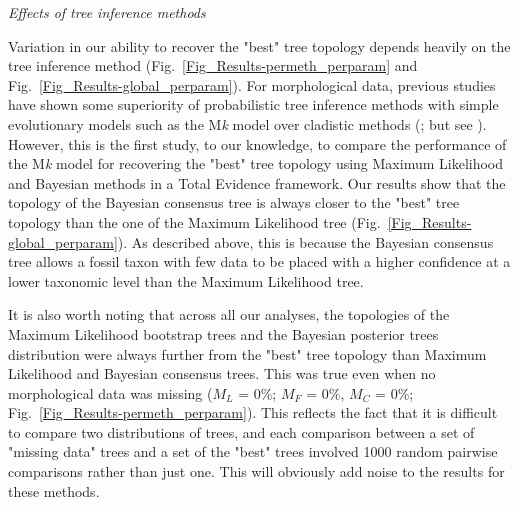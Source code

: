 \documentclass[12pt,letterpaper]{article}
\renewcommand{\subsection}[1]{%
\bigskip
\begin{center}
\begin{large}
\normalfont\itshape #1
\end{large}
\end{center}}
\begin{document}
\subsection{Effects of tree inference methods}
Variation in our ability to recover the "best" tree topology depends heavily on the tree inference method (Fig.~\ref{Fig_Results-permeth_perparam} and Fig.~\ref{Fig_Results-global_perparam}). For morphological data, previous studies have shown some superiority of probabilistic tree inference methods with simple evolutionary models such as the M\textit{k} model \citep{lewisa2001} over cladistic methods (\citealt{wrightbayesian2014}; but see \citealt{spencerefficacy2013}). However, this is the first study, to our knowledge, to compare the performance of the M\textit{k} model \citep{lewisa2001} for recovering the "best" tree topology using Maximum Likelihood and Bayesian methods in a Total Evidence framework. Our results show that the topology of the Bayesian consensus tree is always closer to the "best" tree topology than the one of the Maximum Likelihood tree (Fig.~\ref{Fig_Results-global_perparam}). As described above, this is because the Bayesian consensus tree allows a fossil taxon with few data to be placed with a higher confidence at a lower taxonomic level than the Maximum Likelihood tree. 

It is also worth noting that across all our analyses, the topologies of the Maximum Likelihood bootstrap trees and the Bayesian posterior trees distribution were always further from the "best" tree topology than Maximum Likelihood and Bayesian consensus trees. This was true even when no morphological data was missing ($M_{L}$ = 0\%; $M_{F}$ = 0\%, $M_{C}$ = 0\%; Fig.~\ref{Fig_Results-permeth_perparam}). This reflects the fact that it is difficult to compare two distributions of trees, and each comparison between a set of "missing data" trees and a set of the "best" trees involved 1000 random pairwise comparisons rather than just one. This will obviously add noise to the results for these methods.
\end{document}
